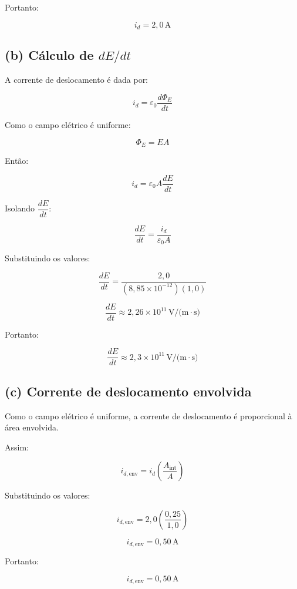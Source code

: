 \documentclass[12pt,a4paper]{article}
\begin{document}
Portanto:

\[
\boxed{i_d = 2,0\,\text{A}}
\]


\subsection*{(b) Cálculo de \texorpdfstring{$dE/dt$}{dE/dt}}

A corrente de deslocamento é dada por:

\[
i_d = \varepsilon_0 \frac{d\Phi_E}{dt}
\]

Como o campo elétrico é uniforme:

\[
\Phi_E = EA
\]

Então:

\[
i_d = \varepsilon_0 A \frac{dE}{dt}
\]

Isolando $\dfrac{dE}{dt}$:

\[
\frac{dE}{dt}
=
\frac{i_d}{\varepsilon_0 A}
\]

Substituindo os valores:

\[
\frac{dE}{dt}
=
\frac{2,0}
{(8,85\times10^{-12})(1,0)}
\]

\[
\frac{dE}{dt}
\approx 2,26\times10^{11}\,\text{V/(m}\cdot\text{s)}
\]

Portanto:

\[
\boxed{
\frac{dE}{dt}
\approx 2,3\times10^{11}\,\text{V/(m}\cdot\text{s)}
}
\]


\subsection*{(c) Corrente de deslocamento envolvida}

Como o campo elétrico é uniforme, a corrente de deslocamento é
proporcional à área envolvida.

Assim:

\[
i_{d,\text{env}}
=
i_d
\left(
\frac{A_{\text{int}}}{A}
\right)
\]

Substituindo os valores:

\[
i_{d,\text{env}}
=
2,0
\left(
\frac{0,25}{1,0}
\right)
\]

\[
i_{d,\text{env}} = 0,50\,\text{A}
\]

Portanto:

\[
\boxed{i_{d,\text{env}} = 0,50\,\text{A}}
\]

\end{document}
